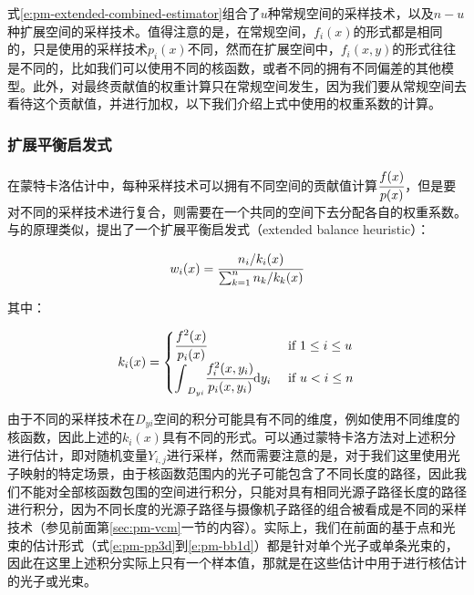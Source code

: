 式\ref{e:pm-extended-combined-estimator}组合了$u$种常规空间的采样技术，以及$n-u$种扩展空间的采样技术。值得注意的是，在常规空间，$f_i(x)$的形式都是相同的，只是使用的采样技术$p_i(x)$不同，然而在扩展空间中，$f_i(x,y)$的形式往往是不同的，比如我们可以使用不同的核函数，或者不同的拥有不同偏差的其他模型。此外，对最终贡献值的权重计算只在常规空间发生，因为我们要从常规空间去看待这个贡献值，并进行加权，以下我们介绍上式中使用的权重系数的计算。




\subsubsection{扩展平衡启发式}
在蒙特卡洛估计中，每种采样技术可以拥有不同空间的贡献值计算$ \cfrac{f(x)}{p(x)}$，但是要对不同的采样技术进行复合，则需要在一个共同的空间下去分配各自的权重系数。与\cite{a:RobustMonteCarloMethodsforLightTransportSimulation}的原理类似，\cite{a:UnifyingPointsBeamsandPathsinVolumetricLightTransportSimulation}提出了一个扩展平衡启发式（extended balance heuristic）：

\begin{equation}
	w_i(x)= \cfrac{n_i/k_i(x)}{\sum^{n}_{k=1}n_k/k_k(x)}
\end{equation}

\noindent 其中：

\begin{equation}
	k_i(x)=\begin{cases}
		\mathlarger{ \cfrac{f^{2}(x)}{p_i(x)}} & \text{ if } 1\leq i\leq u\\
		\mathlarger{{\rm \int}_{D_{yi}} \cfrac{f^{2}_i(x,y_i)}{p_i(x,y_i)}{\rm d}y_i} & \text{ if } u<i\leq n
	\end{cases}
\end{equation}

由于不同的采样技术在$D_{yi}$空间的积分可能具有不同的维度，例如使用不同维度的核函数，因此上述的$k_i(x)$具有不同的形式。可以通过蒙特卡洛方法对上述积分进行估计，即对随机变量$Y_{i,j}$进行采样，然而需要注意的是，对于我们这里使用光子映射的特定场景，由于核函数范围内的光子可能包含了不同长度的路径，因此我们不能对全部核函数包围的空间进行积分，只能对具有相同光源子路径长度的路径进行积分，因为不同长度的光源子路径与摄像机子路径的组合被看成是不同的采样技术（参见前面第\ref{sec:pm-vcm}一节的内容）。实际上，我们在前面的基于点和光束的估计形式（式\ref{e:pm-pp3d}到\ref{e:pm-bb1d}）都是针对单个光子或单条光束的，因此在这里上述积分实际上只有一个样本值，那就是在这些估计中用于进行核估计的光子或光束。


